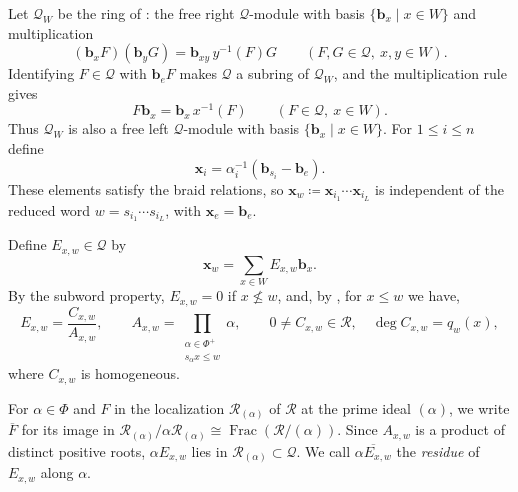 \documentclass[11pt]{amsart}
\theoremstyle{definition}
\theoremstyle{remark}
\numberwithin{equation}{section}
\DeclareMathOperator{\Frac}{Frac}
\begin{document}
Let $\mathcal{Q}_W$ be the ring of \cite[(4.1)]{KostantKumar-86-nilhecke}: the free right $\mathcal{Q}$-module with
basis $\{\mathbf{b}_x \mid x\in W\}$ and multiplication
\[
 (\mathbf{b}_x F)(\mathbf{b}_y G)=\mathbf{b}_{xy}\,y^{-1}(F)G
 \qquad(F,G\in\mathcal{Q},\ x,y\in W).
\]
Identifying $F\in\mathcal{Q}$ with $\mathbf{b}_eF$ makes $\mathcal{Q}$ a subring of $\mathcal{Q}_W$, and
the multiplication rule gives
\begin{equation}
\label{eq:left-module}
 F\mathbf{b}_x=\mathbf{b}_x\,x^{-1}(F)\qquad(F\in\mathcal{Q},\ x\in W).
\end{equation}
Thus $\mathcal{Q}_W$ is also a free left $\mathcal{Q}$-module with basis
$\{\mathbf{b}_x \mid x\in W\}$. For $1\le i\le n$ define
\[
 \mathbf{x}_i=\alpha_i^{-1}(\mathbf{b}_{s_i}-\mathbf{b}_e).
\]
These elements satisfy the braid relations, so
$\mathbf{x}_w \coloneqq \mathbf{x}_{i_1}\cdots \mathbf{x}_{i_L}$ is independent of the
reduced word $w=s_{i_1}\cdots s_{i_L}$, with $\mathbf{x}_e=\mathbf{b}_e$.

Define $E_{x,w}\in\mathcal{Q}$ by
\[
 \mathbf{x}_w=\sum_{x \in W}E_{x,w}\mathbf{b}_x.
\]
By the subword property, $E_{x,w} =0$ if $x \not\leq w$, and, by
\cite[p.~573]{DyerDeodhar}, for $x\le w$ we have,
\begin{equation}\label{eq:nilhecke-numerator}
 E_{x,w}=\frac{C_{x,w}}{A_{x,w}},\qquad
 A_{x,w}=\prod_{\substack{\alpha\in\Phi^+\\s_\alpha x\le w}}\alpha,
 \qquad 0\ne C_{x,w}\in\mathcal{R},\quad \deg C_{x,w}=q_w(x),
\end{equation}
where $C_{x,w}$ is homogeneous.

For $\alpha \in \Phi$ and $F$ in the localization $\mathcal{R}_{(\alpha)}$ of $\mathcal{R}$ at the prime ideal $(\alpha)$, we write $\overline{F}$ for its image in $\mathcal{R}_{(\alpha)}/\alpha \mathcal{R}_{(\alpha)} \cong \Frac(\mathcal{R}/(\alpha))$. Since $A_{x,w}$ is a product of distinct
positive roots, $\alpha E_{x,w}$ lies in $\mathcal{R}_{(\alpha)} \subset \mathcal{Q}$.
We call $\overline{\alpha E_{x,w}}$ the \emph{residue} of $E_{x,w}$ along $\alpha$.
\end{document}
